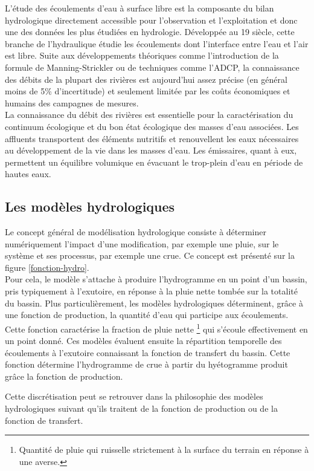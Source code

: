 L’étude des écoulements d'eau à surface libre est la composante du bilan hydrologique directement accessible pour l'observation et l'exploitation et donc une des données les plus étudiées en hydrologie. Développée au 19\ieme{} siècle, cette branche de l’hydraulique étudie les écoulements dont l’interface entre l’eau et l’air est libre. Suite aux développements théoriques comme l’introduction de la formule de Manning-Strickler ou de techniques comme l’ADCP, la connaissance des débits de la plupart des rivières est aujourd'hui assez précise (en général moins de 5\% d'incertitude) et seulement limitée par les coûts économiques et humains des campagnes de mesures.\\

La connaissance du débit des rivières est essentielle pour la caractérisation du continuum écologique et du bon état écologique des masses d’eau associées. Les affluents transportent des éléments nutritifs et renouvellent les eaux nécessaires au développement de la vie dans les masses d’eau. Les émissaires, quant à eux, permettent un équilibre volumique en évacuant le trop-plein d’eau en période de hautes eaux. 

\subsection{{\selectfont Les modèles hydrologiques}}
Le concept général de modélisation hydrologique consiste à déterminer numériquement l'impact d'une modification, par exemple une pluie, sur le système et ses processus, par exemple une crue. Ce concept est présenté sur la figure \ref{fonction-hydro}. \\


\noindent Pour cela, le modèle s'attache à produire l'hydrogramme en un point d'un bassin, pris typiquement à l'exutoire, en réponse à la pluie nette tombée sur la totalité du bassin. Plus particulièrement, les modèles hydrologiques déterminent, grâce à une fonction de production, la quantité d'eau qui participe aux écoulements. Cette fonction caractérise la fraction de pluie nette \footnote{Quantité de pluie qui ruisselle strictement à la surface du terrain en réponse à une averse.} qui s'écoule effectivement en un point donné. Ces modèles évaluent ensuite la répartition temporelle des écoulements à l'exutoire connaissant la fonction de transfert du bassin. Cette fonction détermine l'hydrogramme de crue à partir du hyétogramme produit grâce la fonction de production.

Cette discrétisation peut se retrouver dans la philosophie des modèles hydrologiques suivant qu'ils traitent de la fonction de production ou de la fonction de transfert. \\

